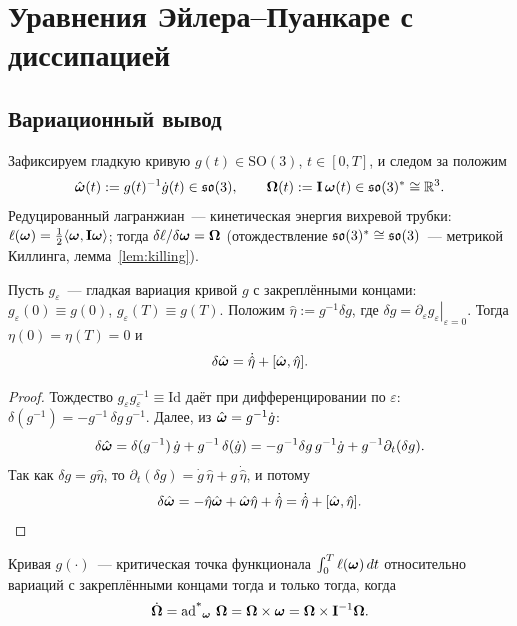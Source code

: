 \needspace{0.25\textheight}
\section{Уравнения Эйлера--Пуанкаре с диссипацией}\label{sec:ep}

\subsection{Вариационный вывод}

Зафиксируем гладкую кривую $g(t) \in \mathrm{SO}(3)$, $t \in [0,T]$,
и следом за \cite{arnold,hmr,marsdenratiu} положим
\[
  \hat{\boldsymbol{\omega}}(t) := g(t)^{-1}\dot g(t) \in \mathfrak{so}(3),
  \qquad
  \boldsymbol{\Omega}(t) := \mathbf{I}\,\boldsymbol{\omega}(t) \in \mathfrak{so}(3)^{*} \cong \mathbb{R}^3 .
\]
Редуцированный лагранжиан~--- кинетическая энергия вихревой трубки:
$\ell(\boldsymbol{\omega}) = \tfrac12\langle \boldsymbol{\omega}, \mathbf{I}\boldsymbol{\omega}\rangle$; тогда
$\delta\ell/\delta\boldsymbol{\omega} = \boldsymbol{\Omega}$ (отождествление $\mathfrak{so}(3)^{*} \cong \mathfrak{so}(3)$~---
метрикой Киллинга, лемма~\ref{lem:killing}).

\begin{lemma}\label{lem:variation}
Пусть $g_\varepsilon$~--- гладкая вариация кривой $g$ с закреплёнными
концами: $g_\varepsilon(0) \equiv g(0)$, $g_\varepsilon(T) \equiv g(T)$.
Положим $\hat\eta := g^{-1}\delta g$, где
$\delta g = \left.\partial_\varepsilon g_\varepsilon\right|_{\varepsilon=0}$.
Тогда $\eta(0) = \eta(T) = 0$ и
\begin{equation}\label{eq:varomega}
  \delta\hat{\boldsymbol{\omega}} = \dot{\hat\eta} + [\hat{\boldsymbol{\omega}}, \hat\eta] .
\end{equation}
\end{lemma}

\begin{proof}
Тождество $g_\varepsilon g_\varepsilon^{-1} \equiv \mathrm{Id}$ даёт
при дифференцировании по $\varepsilon$:
$\delta(g^{-1}) = -g^{-1}\,\delta g\,g^{-1}$. Далее, из
$\hat{\boldsymbol{\omega}} = g^{-1}\dot g$:
\[
  \delta\hat{\boldsymbol{\omega}}
  = \delta(g^{-1})\,\dot g + g^{-1}\,\delta(\dot g)
  = -g^{-1}\delta g\,g^{-1}\dot g + g^{-1}\partial_t(\delta g).
\]
Так как $\delta g = g\hat\eta$, то
$\partial_t(\delta g) = \dot g\,\hat\eta + g\,\dot{\hat\eta}$, и потому
\[
  \delta\hat{\boldsymbol{\omega}} = -\hat\eta\hat{\boldsymbol{\omega}} + \hat{\boldsymbol{\omega}}\hat\eta + \dot{\hat\eta}
  = \dot{\hat\eta} + [\hat{\boldsymbol{\omega}},\hat\eta].
  \qedhere
\]
\end{proof}

\begin{theorem}\label{th:ep}
Кривая $g(\cdot)$~--- критическая точка функционала
$\int_0^T \ell(\boldsymbol{\omega})\,dt$ относительно вариаций с закреплёнными концами
тогда и только тогда, когда
\begin{equation}\label{eq:ep}
  \dot{\boldsymbol{\Omega}} = \operatorname{ad^{*}}_{\boldsymbol{\omega}}\,\boldsymbol{\Omega} = \boldsymbol{\Omega} \times \boldsymbol{\omega} = \boldsymbol{\Omega} \times \mathbf{I}^{-1}\boldsymbol{\Omega} .
\end{equation}
\end{theorem}

